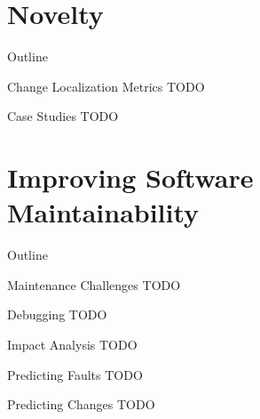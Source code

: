 

\section{Novelty}

\begin{frame}{Outline}
  \tableofcontents[current]
\end{frame}


\begin{frame}{Change Localization Metrics}
  TODO
\end{frame}


\begin{frame}{Case Studies}
  TODO
\end{frame}



\section{Improving Software Maintainability}

\begin{frame}{Outline}
  \tableofcontents[current]
\end{frame}


\begin{frame}{Maintenance Challenges}
  TODO
\end{frame}


\begin{frame}{Debugging}
  TODO
\end{frame}


\begin{frame}{Impact Analysis}
  TODO
\end{frame}


\begin{frame}{Predicting Faults}
  TODO
\end{frame}


\begin{frame}{Predicting Changes}
  TODO
\end{frame}


